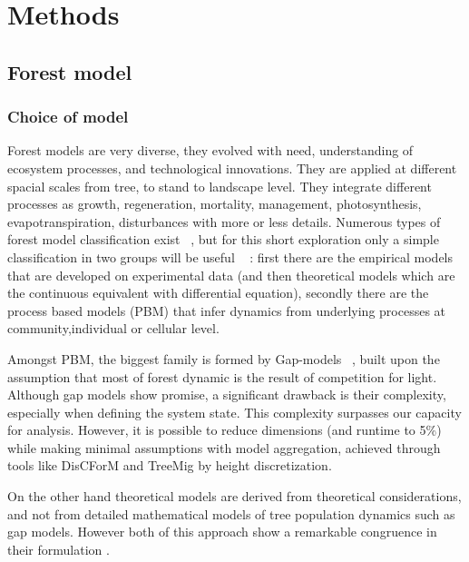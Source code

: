 \documentclass{article}
\begin{document}
\section{Methods}

\subsection{Forest model}

\subsubsection{Choice of model}

Forest models are very diverse, they evolved with need, understanding of ecosystem processes, and technological innovations. They are applied at different spacial scales from tree, to stand to landscape level. They integrate different processes as growth, regeneration, mortality, management, photosynthesis, evapotranspiration, disturbances with more or less details. Numerous types of forest model classification exist ~\autocite{porteModellingMixedForest2002}, but for this short exploration only a simple classification in two groups will be useful ~\autocite{fontesModelsSupportingForest2011} : first there are the empirical models that are developed on experimental data (and then theoretical models which are the continuous equivalent with differential equation), secondly there are the process based models (PBM) that infer dynamics from underlying processes at community,individual or cellular level. 

Amongst PBM, the biggest family is formed by Gap-models ~\autocite{bugmannREVIEWFORESTGAP2001}, built upon the assumption that most of forest dynamic is the result of competition for light.
Although gap models show promise, a significant drawback is their complexity, especially when defining the system state. This complexity surpasses our capacity for analysis. However, it is possible to reduce dimensions (and runtime to 5\%) while making minimal assumptions with model aggregation, achieved through tools like DisCForM and TreeMig \autocite{lischkeAggregationIndividualTrees1998,lischkeTreeMigForestlandscapeModel2006} by height discretization.

On the other hand theoretical models are derived from theoretical considerations, and not from detailed mathematical models of tree population dynamics such as gap models. However both of this approach show a remarkable congruence in their formulation \autocite{bugmannREVIEWFORESTGAP2001}.
\end{document}
